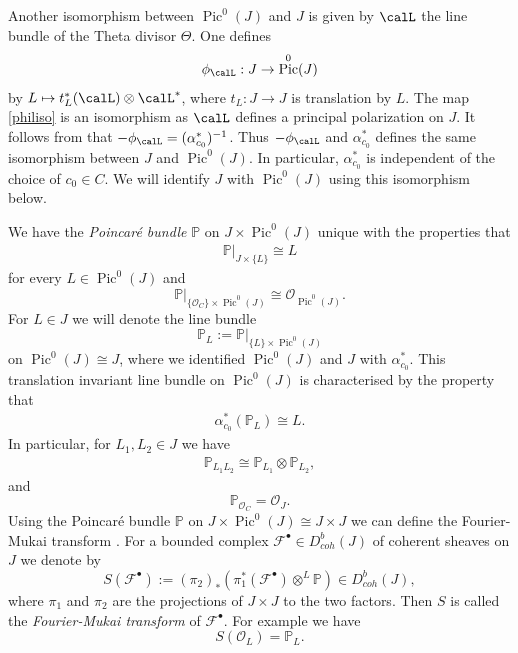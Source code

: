 \documentclass[12pt]{article}
\numberwithin{equation}{section}
\theoremstyle{remark}
\theoremstyle{definition}
\numberwithin{theorem}{section}
\def\beq{\begin{eqnarray}}
\def\eeq{\end{eqnarray}}
\def\bes{\begin{eqnarray*}}
\def\ees{\end{eqnarray*}}
\def\bP{{\mathbb P}}
\DeclareMathOperator{\Pic}{Pic}
\def\calF{{\mathcal{F}}}
\def\calO{{\mathcal O}}
\renewcommand{\1}{\mathbbm{1}}
\begin{document}


Another isomorphism between $\Pic^0(J)$ and $J$ is given by $\calL$ the line bundle of the Theta divisor $\Theta$.  One defines \beq \label{philiso} \phi_\calL: J\to \Pic^0(J)\eeq by $L\mapsto t_L^*(\calL) \otimes \calL^*$, where $t_L:J\to J$ is translation by $L$. The map \eqref{philiso} is an isomorphism as $\calL$ defines  a principal polarization on $J$. It follows from \cite[Proposition 11.3.5]{birkenhake-lange} that $-\phi_\calL=(\alpha^*_{c_0})^{-1}$. Thus $-\phi_\calL$ and $\alpha^*_{c_0}$ defines the same isomorphism between $J$ and $\Pic^0(J)$. In particular, $\alpha^*_{c_0}$ is independent of the choice of $c_0\in C$.  We will identify $J$ with $\Pic^0(J)$ using this isomorphism below. 

We have the {\em Poincar\'e bundle} $\bP$ on $J\times \Pic^0(J)$ unique with the properties that \beq \label{poiniden} \bP|_{J\times \{L\}}\cong L\eeq for every $L\in \Pic^0(J)$ and $$\bP|_{\{\calO_C\}\times \Pic^0(J)}\cong \calO_{\Pic^0(J)}.$$
For $L\in J$ we will denote the line bundle $$\bP_{L}:= \bP|_{\{L\}\times \Pic^0(J)}$$ on $\Pic^0(J)\cong J$, where we identified  $\Pic^0(J)$ and $J$ with $\alpha_{c_0}^*$. This translation invariant line bundle on $\Pic^0(J)$ is characterised by the property that \beq\label{char}\alpha^*_{c_0}(\bP_L)\cong L.\eeq
In particular, for ${L_1},L_2\in J$ we have \beq \label{tensorp}\bP_{{L_1}L_2}\cong  \bP_{{L_1}}\otimes \bP_{L_2},\eeq and $$\bP_{\calO_C}=\calO_{J}.$$
Using the Poincar\'e bundle $\bP$ on $J\times \Pic^0(J)\cong J\times J$  we can define the Fourier-Mukai transform \cite{mukai}. For a bounded complex $\calF^\bullet \in D_{coh}^b(J)$ of coherent sheaves on $J$ we denote by $$S(\calF^\bullet):=(\pi_2)_*(\pi_1^*(\calF^\bullet)\otimes^L \bP)\in D^b_{coh}(J),$$ where $\pi_1$ and $\pi_2$ are the projections of $J\times J$ to the two factors. Then $S$ is called
the {\em Fourier-Mukai transform }of $\calF^\bullet$. For example we have $$S(\calO_{L})=\bP_L.$$ 
\end{document}
